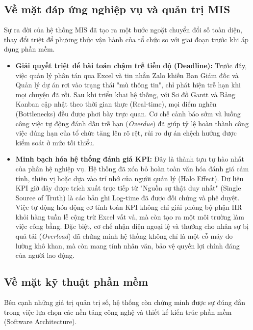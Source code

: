 \documentclass[a4paper,13.5pt]{extreport}
\begin{document}
\subsection{Về mặt đáp ứng nghiệp vụ và quản trị MIS}

Sự ra đời của hệ thống MIS đã tạo ra một bước ngoặt chuyển đổi số toàn diện, thay đổi triệt để phương thức vận hành của tổ chức so với giai đoạn trước khi áp dụng phần mềm.

\begin{itemize}
    \item \textbf{Giải quyết triệt để bài toán chậm trễ tiến độ (Deadline):} Trước đây, việc quản lý phân tán qua Excel và tin nhắn Zalo khiến Ban Giám đốc và Quản lý dự án rơi vào trạng thái "mù thông tin", chỉ phát hiện trễ hạn khi mọi chuyện đã rồi. Sau khi triển khai hệ thống, với Sơ đồ Gantt và Bảng Kanban cập nhật theo thời gian thực (Real-time), mọi điểm nghẽn (Bottlenecks) đều được phơi bày trực quan. Cơ chế cảnh báo sớm và luồng công việc tự động đánh dấu trễ hạn (\textit{Overdue}) đã giúp tỷ lệ hoàn thành công việc đúng hạn của tổ chức tăng lên rõ rệt, rủi ro dự án chệch hướng được kiểm soát ở mức tối thiểu.
    \item \textbf{Minh bạch hóa hệ thống đánh giá KPI:} Đây là thành tựu tự hào nhất của phân hệ nghiệp vụ. Hệ thống đã xóa bỏ hoàn toàn văn hóa đánh giá cảm tính, thiên vị hoặc dựa vào trí nhớ của người quản lý (Halo Effect). Dữ liệu KPI giờ đây được trích xuất trực tiếp từ "Nguồn sự thật duy nhất" (Single Source of Truth) là các bản ghi Log-time đã được đối chứng và phê duyệt. Việc tự động hóa động cơ tính toán KPI không chỉ giải phóng bộ phận HR khỏi hàng tuần lễ cộng trừ Excel vất vả, mà còn tạo ra một môi trường làm việc công bằng. Đặc biệt, cơ chế nhận diện ngoại lệ và thưởng cho nhân sự bị quá tải (\textit{Overload}) đã chứng minh hệ thống không chỉ là một cỗ máy đo lường khô khan, mà còn mang tính nhân văn, bảo vệ quyền lợi chính đáng của người lao động.
\end{itemize}

\subsection{Về mặt kỹ thuật phần mềm}

Bên cạnh những giá trị quản trị số, hệ thống còn chứng minh được sự đúng đắn trong việc lựa chọn các nền tảng công nghệ và thiết kế kiến trúc phần mềm (Software Architecture).
\end{document}
